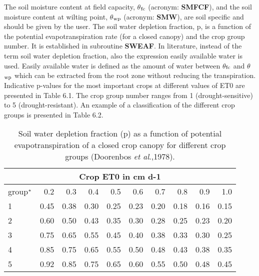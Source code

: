 The soil moisture content at field capacity, {\bf $\theta$$_{{\rm fc}}$} (acronym: {\bf SMFCF}), 
and the soil moisture content at wilting point, {\bf $\theta$$_{{\rm wp}}$} (acronym: {\bf SMW}), 
are soil specific and should be given by the user. The soil water depletion fraction, p, is 
a function of the potential evapotranspiration rate (for a closed canopy) and the crop group 
number. It is established in subroutine
{\bf SWEAF}. In literature, instead of the term soil water depletion fraction, also the 
expression easily available water is used. Easily available water is defined as the amount of
water between $\theta$$_{{\rm fc}}$ and $\theta$$_{{\rm wp}}$ which can be extracted from the root 
zone without reducing the
transpiration. Indicative p-values for the most important crops at different values of ET0
are presented in Table 6.1. The crop group number ranges from 1 (drought-sensitive) to 5
(drought-resistant). An example of a classification of the different crop groups is
presented in Table 6.2.

\begin{table}
	\caption{Soil water depletion fraction (p) as a function of potential evapotranspiration 
		of a closed crop canopy for different crop groups (Doorenbos {\it et al}.,1978).}
	\label{tbl:soilwatdeplfraction}
	\begin{tabularx}{\textwidth}{Xrrrrrrrrr}
		\hline
		\multicolumn{10}{c}{Crop ET0 in cm d-1}\\
		\hline
		group$^{\rm *}$ & 0.2 & 0.3 & 0.4 & 0.5 & 0.6 & 0.7 & 0.8 & 0.9 & 1.0\\
		1 & 0.45 & 0.38 & 0.30 & 0.25 & 0.23 & 0.20 & 0.18 & 0.16 & 0.15\\
		2 & 0.60 & 0.50 & 0.43 & 0.35 & 0.30 & 0.28 & 0.25 & 0.23 & 0.20\\
		3 & 0.75 & 0.65 & 0.55 & 0.45 & 0.40 & 0.38 & 0.33 & 0.30 & 0.25\\
		4 & 0.85 & 0.75 & 0.65 & 0.55 & 0.50 & 0.48 & 0.43 & 0.38 & 0.35\\
		5 & 0.92 & 0.85 & 0.75 & 0.65 & 0.60 & 0.55 & 0.50 & 0.48 & 0.45\\
		\hline 
	\end{tabularx} 
\end{table}


